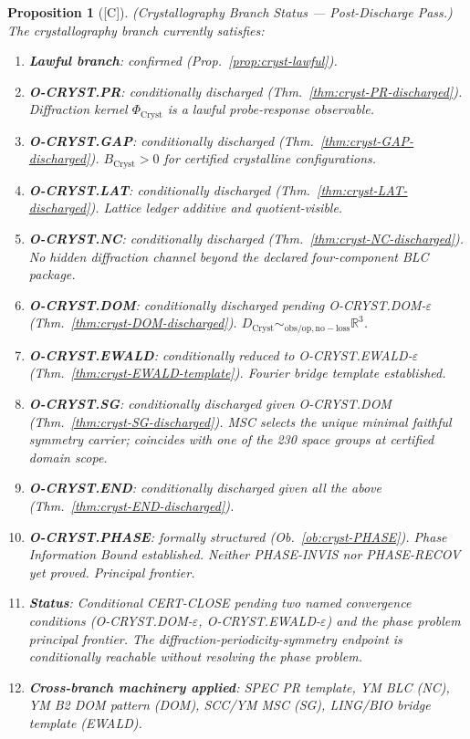 \documentclass[12pt,oneside]{amsbook}
\theoremstyle{plain}
\newtheorem{proposition}[theorem]{Proposition}
\theoremstyle{definition}
\theoremstyle{remark}
\newcommand{\status}[1]{\textup{[#1]}}
\begin{document}
\begin{proposition}[\status{C}]\label{prop:cryst-status}
\textup{(Crystallography Branch Status --- Post-Discharge Pass.)}
The crystallography branch currently satisfies:
\begin{enumerate}[label=\textup{(\arabic*)}]
  \item \textbf{Lawful branch}: confirmed (Prop.~\ref{prop:cryst-lawful}).
  \item \textbf{O-CRYST.PR}: conditionally discharged
    (Thm.~\ref{thm:cryst-PR-discharged}).  Diffraction kernel
    $\Phi_{\mathrm{Cryst}}$ is a lawful probe-response observable.
  \item \textbf{O-CRYST.GAP}: conditionally discharged
    (Thm.~\ref{thm:cryst-GAP-discharged}).  $B_{\mathrm{Cryst}} > 0$
    for certified crystalline configurations.
  \item \textbf{O-CRYST.LAT}: conditionally discharged
    (Thm.~\ref{thm:cryst-LAT-discharged}).  Lattice ledger
    additive and quotient-visible.
  \item \textbf{O-CRYST.NC}: conditionally discharged
    (Thm.~\ref{thm:cryst-NC-discharged}).  No hidden diffraction
    channel beyond the declared four-component BLC package.
  \item \textbf{O-CRYST.DOM}: conditionally discharged pending
    O-CRYST.DOM-$\varepsilon$ (Thm.~\ref{thm:cryst-DOM-discharged}).
    $D_{\mathrm{Cryst}} \sim_{\mathrm{obs/op,no-loss}} \mathbb{R}^3$.
  \item \textbf{O-CRYST.EWALD}: conditionally reduced to
    O-CRYST.EWALD-$\varepsilon$ (Thm.~\ref{thm:cryst-EWALD-template}).
    Fourier bridge template established.
  \item \textbf{O-CRYST.SG}: conditionally discharged given
    O-CRYST.DOM (Thm.~\ref{thm:cryst-SG-discharged}).  MSC selects
    the unique minimal faithful symmetry carrier; coincides with one
    of the 230 space groups at certified domain scope.
  \item \textbf{O-CRYST.END}: conditionally discharged given all
    the above (Thm.~\ref{thm:cryst-END-discharged}).
  \item \textbf{O-CRYST.PHASE}: formally structured
    (Ob.~\ref{ob:cryst-PHASE}).  Phase Information Bound established.
    Neither PHASE-INVIS nor PHASE-RECOV yet proved.  Principal frontier.
  \item \textbf{Status}: \emph{Conditional CERT-CLOSE pending two
    named convergence conditions (O-CRYST.DOM-$\varepsilon$,
    O-CRYST.EWALD-$\varepsilon$) and the phase problem principal
    frontier.  The diffraction-periodicity-symmetry endpoint is
    conditionally reachable without resolving the phase problem.}
  \item \textbf{Cross-branch machinery applied}: SPEC PR template,
    YM BLC (NC), YM B2 DOM pattern (DOM), SCC/YM MSC (SG),
    LING/BIO bridge template (EWALD).
\end{enumerate}
\end{proposition}
\end{document}
